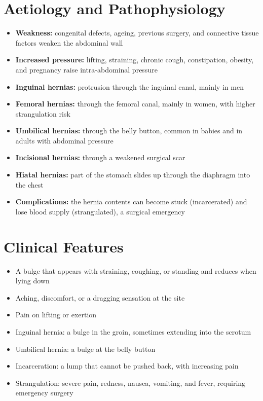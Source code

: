 \section*{Aetiology and Pathophysiology}
\begin{itemize}
    \item \textbf{Weakness:} congenital defects, ageing, previous surgery, and connective tissue factors weaken the abdominal wall
    \item \textbf{Increased pressure:} lifting, straining, chronic cough, constipation, obesity, and pregnancy raise intra-abdominal pressure
    \item \textbf{Inguinal hernias:} protrusion through the inguinal canal, mainly in men
    \item \textbf{Femoral hernias:} through the femoral canal, mainly in women, with higher strangulation risk
    \item \textbf{Umbilical hernias:} through the belly button, common in babies and in adults with abdominal pressure
    \item \textbf{Incisional hernias:} through a weakened surgical scar
    \item \textbf{Hiatal hernias:} part of the stomach slides up through the diaphragm into the chest
    \item \textbf{Complications:} the hernia contents can become stuck (incarcerated) and lose blood supply (strangulated), a surgical emergency
\end{itemize}

\section*{Clinical Features}
\begin{itemize}
    \item A bulge that appears with straining, coughing, or standing and reduces when lying down
    \item Aching, discomfort, or a dragging sensation at the site
    \item Pain on lifting or exertion
    \item Inguinal hernia: a bulge in the groin, sometimes extending into the scrotum
    \item Umbilical hernia: a bulge at the belly button
    \item Incarceration: a lump that cannot be pushed back, with increasing pain
    \item Strangulation: severe pain, redness, nausea, vomiting, and fever, requiring emergency surgery
\end{itemize}


